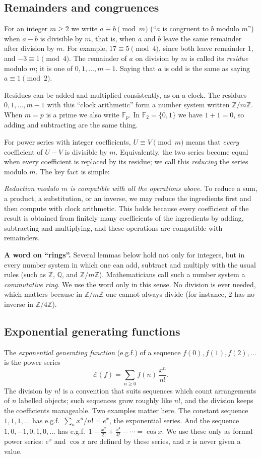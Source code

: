 \documentclass[11pt,a4paper]{article}
\theoremstyle{definition}
\theoremstyle{remark}
\newcommand{\Z}{\mathbb{Z}}
\newcommand{\Q}{\mathbb{Q}}
\newcommand{\F}{\mathbb{F}}
\newcommand{\para}[1]{\par\medskip\noindent\textbf{#1}\enspace}
\begin{document}
\subsection{Remainders and congruences}
For an integer $m\ge2$ we write $a\equiv b\pmod m$ (``$a$ is congruent to $b$ modulo $m$'') when $a-b$ is divisible by
$m$, that is, when $a$ and $b$ leave the same remainder after division by $m$. For example, $17\equiv5\pmod 4$, since both leave remainder $1$, and $-3\equiv1\pmod4$. The
remainder of $a$ on division by $m$ is called its \emph{residue} modulo $m$; it is one of $0,1,\dots,m-1$. Saying that
$a$ is odd is the same as saying $a\equiv1\pmod2$.

Residues can be added and multiplied consistently, as on a clock. The residues $0,1,\dots,m-1$ with this ``clock
arithmetic'' form a number system written $\Z/m\Z$. When $m=p$ is a prime we also write $\F_p$. In $\F_2=\{0,1\}$ we
have $1+1=0$, so adding and subtracting are the same thing.

For power series with integer coefficients, $U\equiv V\pmod m$ means that \emph{every} coefficient of $U-V$ is
divisible by $m$. Equivalently, the two series become equal when every coefficient is replaced by its residue; we call
this \emph{reducing} the series modulo $m$. The key fact is simple:

\emph{Reduction modulo $m$ is compatible with all the operations above.} To reduce a sum, a product, a substitution, or
an inverse, we may reduce the ingredients first and then compute with clock arithmetic. This holds because every
coefficient of the result is obtained from finitely many coefficients of the ingredients by adding, subtracting and
multiplying, and these operations are compatible with remainders.

\para{A word on ``rings''.} Several lemmas below hold not only for integers, but in every number system in
which one can add, subtract and multiply with the usual rules (such as $\Z$, $\Q$, and $\Z/m\Z$). Mathematicians call
such a number system a \emph{commutative ring}. We use the word only in this sense. No division is ever needed, which
matters because in $\Z/m\Z$ one cannot always divide (for instance, $2$ has no inverse in $\Z/4\Z$).

\subsection{Exponential generating functions}
The \emph{exponential generating function} (e.g.f.) of a sequence $f(0),f(1),f(2),\dots$ is the power series
\[
\mathcal E(f)=\sum_{n\ge0}f(n)\,\frac{x^n}{n!}.
\]
The division by $n!$ is a convention that suits sequences which count arrangements of $n$ labelled objects; such
sequences grow roughly like $n!$, and the division keeps the coefficients manageable. Two examples matter here. The
constant sequence $1,1,1,\dots$ has e.g.f.\ $\sum_nx^n/n!=e^x$, the exponential series. And the sequence $1,0,-1,0,1,0,\dots$
has e.g.f.\ $1-\frac{x^2}{2!}+\frac{x^4}{4!}-\cdots=\cos x$. We use these only as formal power series: $e^x$ and
$\cos x$ are defined by these series, and $x$ is never given a value.
\end{document}
